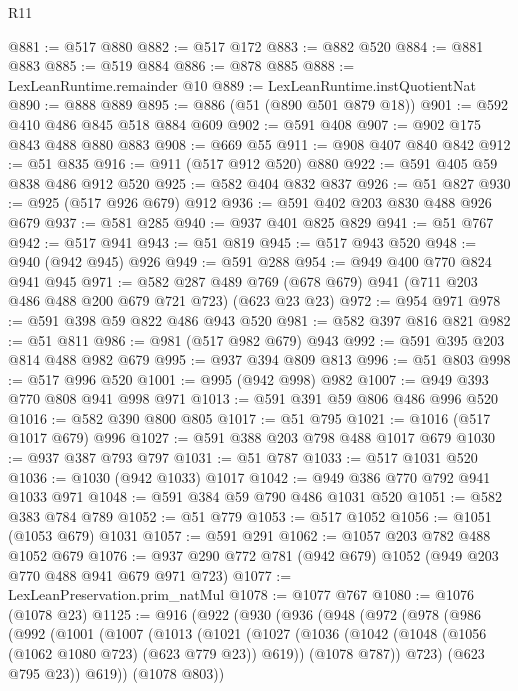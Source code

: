 \begin{lexlean}{R11}
\begin{coremodule}
@881 := @517 @880
@882 := @517 @172
@883 := @882 @520
@884 := @881 @883
@885 := @519 @884
@886 := @878 @885
@888 := LexLeanRuntime.remainder @10
@889 := LexLeanRuntime.instQuotientNat
@890 := @888 @889
@895 := @886 (@51 (@890 @501 @879 @18))
@901 := @592 @410 @486 @845 @518 @884 @609
@902 := @591 @408
@907 := @902 @175 @843 @488 @880 @883
@908 := @669 @55
@911 := @908 @407 @840 @842
@912 := @51 @835
@916 := @911 (@517 @912 @520) @880
@922 := @591 @405 @59 @838 @486 @912 @520
@925 := @582 @404 @832 @837
@926 := @51 @827
@930 := @925 (@517 @926 @679) @912
@936 := @591 @402 @203 @830 @488 @926 @679
@937 := @581 @285
@940 := @937 @401 @825 @829
@941 := @51 @767
@942 := @517 @941
@943 := @51 @819
@945 := @517 @943 @520
@948 := @940 (@942 @945) @926
@949 := @591 @288
@954 := @949 @400 @770 @824 @941 @945
@971 := @582
    @287
    @489
    @769
    (@678 @679)
    @941
    (@711 @203 @486 @488 @200 @679 @721 @723)
    (@623 @23 @23)
@972 := @954 @971
@978 := @591 @398 @59 @822 @486 @943 @520
@981 := @582 @397 @816 @821
@982 := @51 @811
@986 := @981 (@517 @982 @679) @943
@992 := @591 @395 @203 @814 @488 @982 @679
@995 := @937 @394 @809 @813
@996 := @51 @803
@998 := @517 @996 @520
@1001 := @995 (@942 @998) @982
@1007 := @949 @393 @770 @808 @941 @998 @971
@1013 := @591 @391 @59 @806 @486 @996 @520
@1016 := @582 @390 @800 @805
@1017 := @51 @795
@1021 := @1016 (@517 @1017 @679) @996
@1027 := @591 @388 @203 @798 @488 @1017 @679
@1030 := @937 @387 @793 @797
@1031 := @51 @787
@1033 := @517 @1031 @520
@1036 := @1030 (@942 @1033) @1017
@1042 := @949 @386 @770 @792 @941 @1033 @971
@1048 := @591 @384 @59 @790 @486 @1031 @520
@1051 := @582 @383 @784 @789
@1052 := @51 @779
@1053 := @517 @1052
@1056 := @1051 (@1053 @679) @1031
@1057 := @591 @291
@1062 := @1057 @203 @782 @488 @1052 @679
@1076 := @937 @290 @772 @781 (@942 @679) @1052 (@949 @203 @770 @488 @941 @679 @971 @723)
@1077 := LexLeanPreservation.prim_natMul
@1078 := @1077 @767
@1080 := @1076 (@1078 @23)
@1125 := @916
    (@922
      (@930
        (@936
          (@948
            (@972
              (@978
                (@986
                  (@992
                    (@1001
                      (@1007
                        (@1013
                          (@1021
                            (@1027
                              (@1036
                                (@1042 (@1048 (@1056 (@1062 @1080 @723) (@623 @779 @23)) @619))
                                (@1078 @787))
                              @723)
                            (@623 @795 @23))
                          @619))
                      (@1078 @803))

\end{coremodule}
\end{lexlean}
